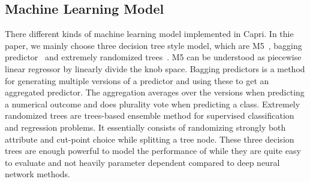   \subsection{Machine Learning Model}
  \label{sec:maching_learning_model}
  There different kinds of machine learning model implemented in Capri. In
  thie paper, we mainly choose three decision tree style model, which are
  M5~\cite{quinlan1992learning}, bagging predictor~\cite{breiman1996bagging}
  and extremely randomized trees~\cite{geurts2006extremely}. M5 can be
  understood as piecewise linear regressor by linearly divide the knob space.
  Bagging predictors is a method for generating multiple versions of a
  predictor and using these to get an aggregated predictor. The aggregation
  averages over the versions when predicting a numerical outcome and does
  plurality vote when predicting a class. Extremely randomized trees are
  trees-based ensemble method for supervised classification and regression
  problems. It essentially consists of randomizing strongly both attribute
  and cut-point choice while splitting a tree node. These three decision trees
  are enough powerful to model the performance of \gem while they are quite
  easy to evaluate and not heavily parameter dependent compared to
  deep neural network methods.
